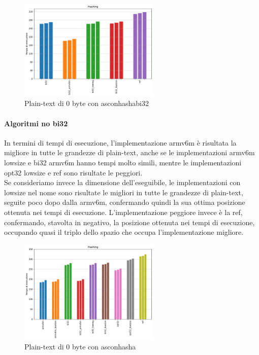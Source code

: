 \documentclass[12pt,a4paper,italian]{report}
\begin{document}
\begin{figure}[H]
    \centering
    \includegraphics[width=0.6\textwidth]{adafruit/asconhashabi32.pdf}
    \caption{Plain-text di 0 byte con asconhashabi32}
\end{figure}

\paragraph{Algoritmi no bi32}

In termini di tempi di esecuzione, l'implementazione armv6m è risultata la migliore in tutte le grandezze di plain-text, anche se le implementazioni armv6m lowsize e bi32 armv6m hanno tempi molto simili, mentre le implementazioni opt32 lowsize e ref sono risultate le peggiori. \\

\noindent Se consideriamo invece la dimensione dell'eseguibile, le implementazioni con lowsize nel nome sono risultate le migliori in tutte le grandezze di plain-text, seguite poco dopo dalla armv6m, confermando quindi la sua ottima posizione ottenuta nei tempi di esecuzione. L'implementazione peggiore invece è la ref, confermando, stavolta in negativo, la posizione ottenuta nei tempi di esecuzione, occupando quasi il triplo dello spazio che occupa l'implementazione migliore.

\begin{figure}[H]
    \centering
    \includegraphics[width=0.6\textwidth]{adafruit/asconhasha.pdf}
    \caption{Plain-text di 0 byte con asconhasha}
\end{figure}
\end{document}
